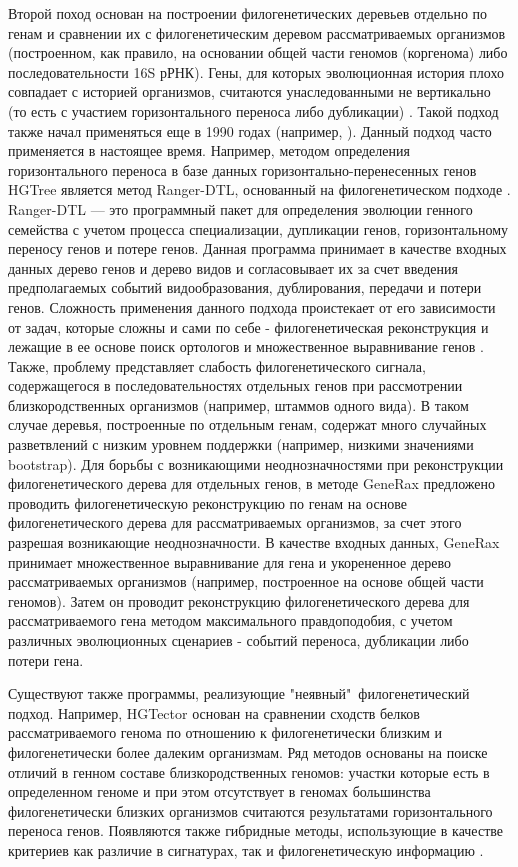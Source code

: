 Второй поход основан на построении филогенетических деревьев отдельно по генам и сравнении их с филогенетическим деревом рассматриваемых организмов (построенном, как правило, на основании общей части геномов (коргенома) либо последовательности 16S рРНК). Гены, для которых эволюционная история плохо совпадает с историей организмов, считаются унаследованными не вертикально (то есть с участием горизонтального переноса либо дубликации) \cite{tofigh2010simultaneous}. Такой подход также начал применяться еще в 1990 годах (например, \cite{smith1992evolution}). Данный подход часто применяется в настоящее время. Например, методом определения горизонтального переноса в базе данных горизонтально-перенесенных генов HGTree \cite{jeong2016hgtree} является метод Ranger-DTL, основанный на филогенетическом подходе \cite{bansal2012efficient}. Ranger-DTL --- это программный пакет для определения эволюции генного семейства с учетом процесса  специализации, дупликации генов, горизонтальному переносу генов и потере генов. Данная программа принимает в качестве входных данных дерево генов и дерево видов и согласовывает их за счет введения предполагаемых событий видообразования, дублирования, передачи и потери генов. Сложность применения данного подхода проистекает от его зависимости от задач, которые сложны и сами по себе - филогенетическая реконструкция и лежащие в ее основе поиск ортологов и множественное выравнивание генов \cite{sevillya2020detecting}. Также, проблему представляет слабость филогенетического сигнала, содержащегося в последовательностях отдельных генов при рассмотрении близкородственных организмов (например, штаммов одного вида). В таком случае деревья, построенные по отдельным генам, содержат много случайных разветвлений с низким уровнем поддержки (например, низкими значениями bootstrap). Для борьбы с возникающими неоднозначностями при реконструкции филогенетического дерева для отдельных генов, в методе GeneRax \cite{morel2020generax} предложено проводить филогенетическую реконструкцию по генам на основе филогенетического дерева для рассматриваемых организмов, за счет этого разрешая возникающие неоднозначности. В качестве входных данных, GeneRax принимает множественное выравнивание для гена и укорененное дерево рассматриваемых организмов (например, построенное на основе общей части геномов). Затем он проводит реконструкцию филогенетического дерева для рассматриваемого гена методом максимального правдоподобия, с учетом различных эволюционных сценариев - событий переноса, дубликации либо потери гена. 

Существуют также программы, реализующие "неявный"\ филогенетический подход. Например, HGTector основан на сравнении сходств белков рассматриваемого генома по отношению к филогенетически близким и филогенетически более далеким организмам. Ряд методов основаны на поиске отличий в генном составе близкородственных геномов: участки которые есть в определенном геноме и при этом отсутствует в геномах большинства филогенетически близких организмов считаются результатами горизонтального переноса генов. Появляются также гибридные методы, использующие в качестве критериев как различие в сигнатурах, так и филогенетическую информацию \cite{sanchez2020shadowcaster}.

